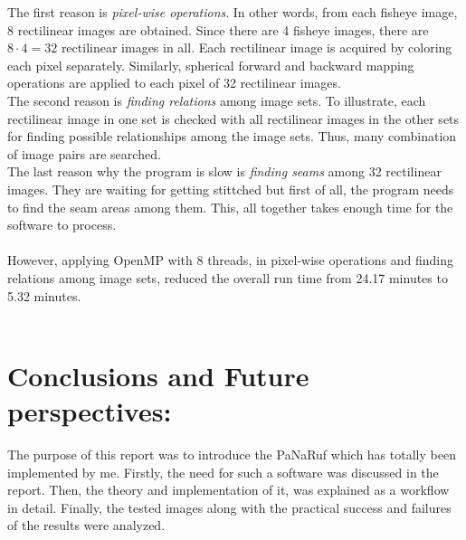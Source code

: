 \documentclass{article}
\begin{document}
The first reason is \textit{pixel-wise operations}. In other words, from each fisheye image, 8 rectilinear images are obtained. Since there are 4 fisheye images, there are $8\cdot4 = 32$ rectilinear images in all. Each rectilinear image is acquired by coloring each pixel separately. Similarly, spherical forward and backward mapping operations are applied to each pixel of 32 rectilinear images.\\
The second reason is \textit{finding relations} among image sets. To illustrate, each rectilinear image in one set is checked with all rectilinear images in the other sets for finding possible relationships among the image sets. Thus, many combination of image pairs are searched. \\
The last reason why the program is slow is \textit{finding seams} among 32 rectilinear images. They are waiting for getting stittched but first of all, the program needs to find the seam areas among them. This, all together takes enough time for the software to process.\\~\\
However, applying OpenMP with 8 threads, in pixel-wise operations and finding relations among image sets, reduced the overall run time from 24.17 minutes to 5.32 minutes.\\~\\
\section*{Conclusions and Future perspectives:}
The purpose of this report was to introduce the PaNaRuf which has totally been implemented by me. Firstly,  the need for such a software was discussed in the report. Then, the theory and implementation of it, was explained as a workflow in detail. Finally, the tested images along with the practical success and failures of the results were analyzed. 
\end{document}
